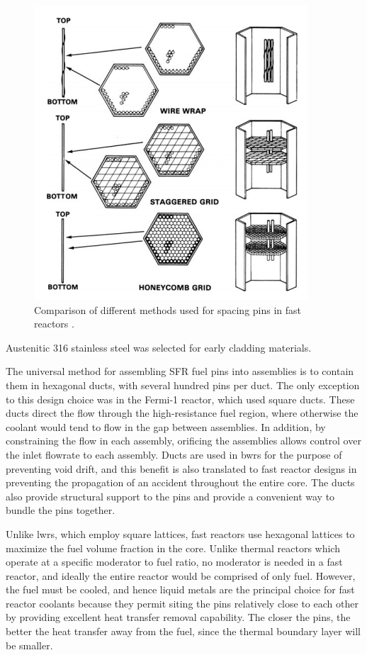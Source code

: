 \documentclass[10pt]{article}
\numberwithin{equation}{section} %
\begin{document}
\begin{figure}[H]
\centering
\includegraphics[width=0.6\linewidth]{figures/FastReactorPinSpacing.pdf}
\caption{Comparison of different methods used for spacing pins in fast reactors \cite{FastReactors}.}
\label{fig:FastReactorPinSpacing}
\end{figure}

Austenitic 316 stainless steel was selected for early cladding materials.

The universal method for assembling SFR fuel pins into assemblies is to contain them in hexagonal ducts, with several hundred pins per duct. The only exception to this design choice was in the Fermi-1 reactor, which used square ducts. These ducts direct the flow through the high-resistance fuel region, where otherwise the coolant would tend to flow in the gap between assemblies. In addition, by constraining the flow in each assembly, orificing the assemblies allows control over the inlet flowrate to each assembly. Ducts are used in \gls{bwr}s for the purpose of preventing void drift, and this benefit is also translated to fast reactor designs in preventing the propagation of an accident throughout the entire core. The ducts also provide structural support to the pins and provide a convenient way to bundle the pins together. 

Unlike \gls{lwr}s, which employ square lattices, fast reactors use hexagonal lattices to maximize the fuel volume fraction in the core. Unlike thermal reactors which operate at a specific moderator to fuel ratio, no moderator is needed in a fast reactor, and ideally the entire reactor would be comprised of only fuel. However, the fuel must be cooled, and hence liquid metals are the principal choice for fast reactor coolants because they permit siting the pins relatively close to each other by providing excellent heat transfer removal capability. The closer the pins, the better the heat transfer away from the fuel, since the thermal boundary layer will be smaller. 
\end{document}
